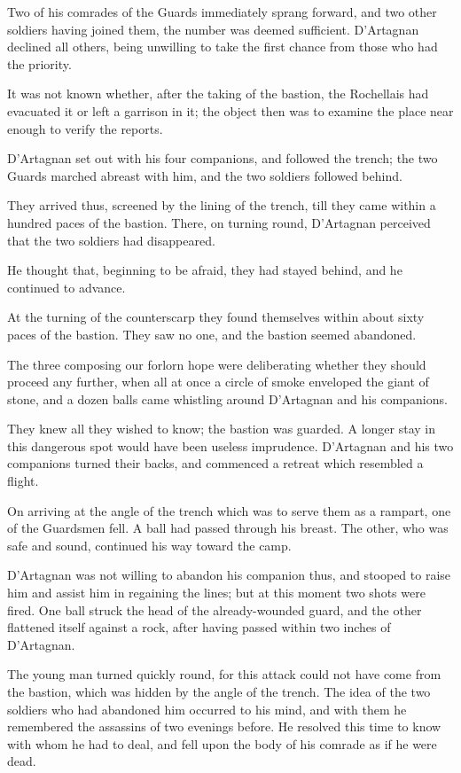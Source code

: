 Two of his comrades of the Guards immediately sprang forward, and two other soldiers having joined them, the number was deemed sufficient. D'Artagnan declined all others, being unwilling to take the first chance from those who had the priority. 

It was not known whether, after the taking of the bastion, the Rochellais had evacuated it or left a garrison in it; the object then was to examine the place near enough to verify the reports. 

D'Artagnan set out with his four companions, and followed the trench; the two Guards marched abreast with him, and the two soldiers followed behind. 

They arrived thus, screened by the lining of the trench, till they came within a hundred paces of the bastion. There, on turning round, D'Artagnan perceived that the two soldiers had disappeared. 

He thought that, beginning to be afraid, they had stayed behind, and he continued to advance. 

At the turning of the counterscarp they found themselves within about sixty paces of the bastion. They saw no one, and the bastion seemed abandoned. 

The three composing our forlorn hope were deliberating whether they should proceed any further, when all at once a circle of smoke enveloped the giant of stone, and a dozen balls came whistling around D'Artagnan and his companions. 

They knew all they wished to know; the bastion was guarded. A longer stay in this dangerous spot would have been useless imprudence. D'Artagnan and his two companions turned their backs, and commenced a retreat which resembled a flight. 

On arriving at the angle of the trench which was to serve them as a rampart, one of the Guardsmen fell. A ball had passed through his breast. The other, who was safe and sound, continued his way toward the camp. 

D'Artagnan was not willing to abandon his companion thus, and stooped to raise him and assist him in regaining the lines; but at this moment two shots were fired. One ball struck the head of the already-wounded guard, and the other flattened itself against a rock, after having passed within two inches of D'Artagnan. 

The young man turned quickly round, for this attack could not have come from the bastion, which was hidden by the angle of the trench. The idea of the two soldiers who had abandoned him occurred to his mind, and with them he remembered the assassins of two evenings before. He resolved this time to know with whom he had to deal, and fell upon the body of his comrade as if he were dead. 

